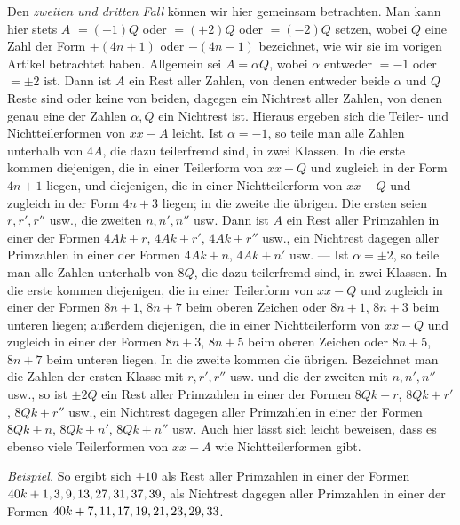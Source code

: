 Den \textit{zweiten und dritten Fall} können wir hier gemeinsam betrachten. Man kann hier stets $A$ $=(-1)Q$ oder $=(+2)Q$ oder $=(-2)Q$ setzen, wobei $Q$ eine Zahl der Form $+(4n+1)$ oder $-(4n-1)$ bezeichnet, wie wir sie im vorigen Artikel betrachtet haben. Allgemein sei $A=\alpha Q$, wobei $\alpha$ entweder $=-1$ oder $=\pm2$ ist. Dann ist $A$ ein Rest aller Zahlen, von denen entweder beide $\alpha$ und $Q$ Reste sind oder keine von beiden, dagegen ein Nichtrest aller Zahlen, von denen genau eine der Zahlen $\alpha,Q$ ein Nichtrest ist. Hieraus ergeben sich die Teiler- und Nichtteilerformen von $xx-A$ leicht. Ist $\alpha=-1$, so teile man alle Zahlen unterhalb von $4A$, die dazu teilerfremd sind, in zwei Klassen. In die erste kommen diejenigen, die in einer Teilerform von $xx-Q$ und zugleich in der Form $4n+1$ liegen, und diejenigen, die in einer Nichtteilerform von $xx-Q$ und zugleich in der Form $4n+3$ liegen; in die zweite die übrigen. Die ersten seien $r,r',r''$ usw., die zweiten $n,n',n''$ usw. Dann ist $A$ ein Rest aller Primzahlen in einer der Formen $4Ak+r$, $4Ak+r'$, $4Ak+r''$ usw., ein Nichtrest dagegen aller Primzahlen in einer der Formen $4Ak+n$, $4Ak+n'$ usw. --- Ist $\alpha=\pm2$, so teile man alle Zahlen unterhalb von $8Q$, die dazu teilerfremd sind, in zwei Klassen. In die erste kommen diejenigen, die in einer Teilerform von $xx-Q$ und zugleich in einer der Formen $8n+1$, $8n+7$ beim oberen Zeichen oder $8n+1$, $8n+3$ beim unteren liegen; außerdem diejenigen, die in einer Nichtteilerform von $xx-Q$ und zugleich in einer der Formen $8n+3$, $8n+5$ beim oberen Zeichen oder $8n+5$, $8n+7$ beim unteren liegen. In die zweite kommen die übrigen. Bezeichnet man die Zahlen der ersten Klasse mit $r,r',r''$ usw. und die der zweiten mit $n,n',n''$ usw., so ist $\pm2Q$ ein Rest aller Primzahlen in einer der Formen $8Qk+r$, $8Qk+r'$, $8Qk+r''$ usw., ein Nichtrest dagegen aller Primzahlen in einer der Formen $8Qk+n$, $8Qk+n'$, $8Qk+n''$ usw. Auch hier lässt sich leicht beweisen, dass es ebenso viele Teilerformen von $xx-A$ wie Nichtteilerformen gibt.

\textit{Beispiel.} So ergibt sich $+10$ als Rest aller Primzahlen in einer der Formen $40k+\nobreak{}1,\allowbreak{}3,\allowbreak{}9,\allowbreak{}13,\allowbreak{}27,\allowbreak{}31,\allowbreak{}37,\allowbreak{}39$, als Nichtrest dagegen aller Primzahlen in einer der Formen $40k+\nobreak{}7,\allowbreak{}11,\allowbreak{}17,\allowbreak{}19,\allowbreak{}21,\allowbreak{}23,\allowbreak{}29,\allowbreak{}33$.

